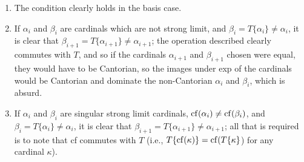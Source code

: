 \begin{enumerate}
 \item The condition clearly holds in the basis case.

 \item If $\alpha_i$ and $\beta_i$ are cardinals which are not strong limit, and
   $\beta_i =  T\{\alpha_i\} 
   \neq \alpha_i$, it is clear that $\beta_{i+1} =  T\{\alpha_{i+1}\}
   \neq \alpha_{i+1}$; the operation described clearly commutes with $T$,
   and so if the cardinals $\alpha_{i+1}$ and $\beta_{i+1}$ chosen were
   equal, they would have to be Cantorian, so the
   images under exp of the cardinals would be Cantorian and dominate the
   non-Cantorian  $\alpha_i$ and $\beta_i$, which is absurd.

 \item If $\alpha_i$ and $\beta_i$ are singular strong limit cardinals,
   $\mathop{\mathrm{cf}}(\alpha_i) \neq \mathop{\mathrm{cf}}(\beta_i)$, and $\beta_i =  T\{\alpha_i\}
   \neq \alpha_i$, it is clear that $\beta_{i+1} =  T\{\alpha_{i+1}\}
   \neq \alpha_{i+1}$; all that is required is to note that cf commutes
   with $T$ (i.e., $T\{\mathop{\mathrm{cf}}(\kappa)\} = \mathop{\mathrm{cf}}(T\{\kappa\}$) for any
   cardinal $\kappa$).


\end{enumerate}
